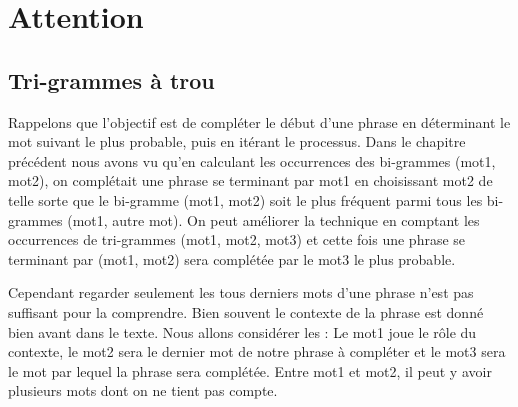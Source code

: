 \documentclass[11pt,class=report,crop=false]{standalone}
\begin{document}
\section{Attention}


\subsection{Tri-grammes à trou}

Rappelons que l'objectif est de compléter le début d'une phrase en déterminant le mot suivant le plus probable, puis en itérant le processus.
Dans le chapitre précédent nous avons vu qu'en calculant les occurrences des bi-grammes (mot1, mot2), on complétait une phrase se terminant par mot1 en choisissant mot2 de telle sorte que le bi-gramme (mot1, mot2) soit le plus fréquent parmi tous les bi-grammes (mot1, autre mot).
On peut améliorer la technique en comptant les occurrences de tri-grammes (mot1, mot2, mot3) et cette fois une phrase se terminant par (mot1, mot2) sera complétée par le mot3 le plus probable.

Cependant regarder seulement les tous derniers mots d'une phrase n'est pas suffisant pour la comprendre. Bien souvent le contexte de la phrase est donné bien avant dans le texte.
Nous allons considérer les  :
Le mot1 joue le rôle du contexte, le mot2 sera le dernier mot de notre phrase à compléter et le mot3 sera le mot par lequel la phrase sera complétée. Entre mot1 et mot2, il peut y avoir plusieurs mots dont on ne tient pas compte.
\end{document}
